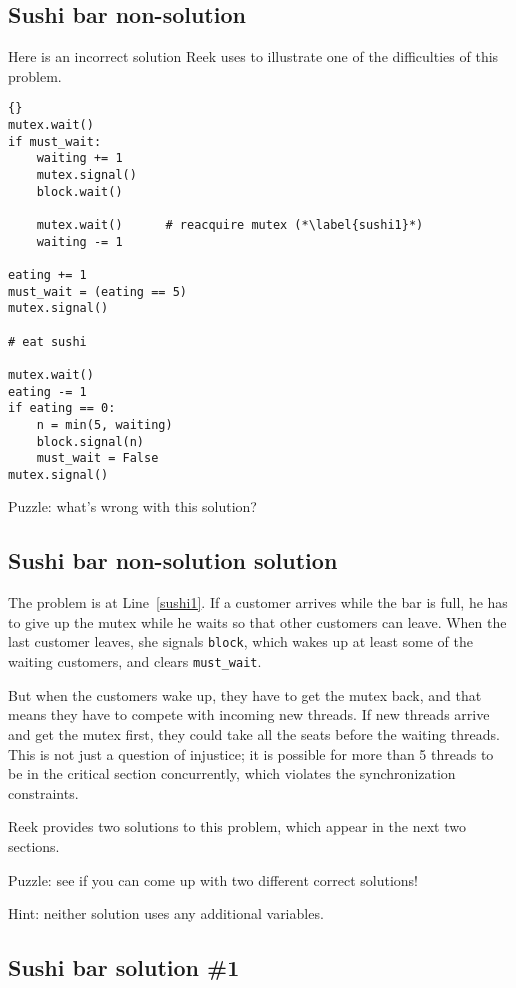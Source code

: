 \documentclass{book}
\newcommand{\clearemptydoublepage}{\newpage\cleardoublepage}
\begin{document}
\clearemptydoublepage
\subsection {Sushi bar non-solution}

Here is an incorrect solution Reek uses to illustrate one
of the difficulties of this problem.

\begin{lstlisting}[title={Sushi bar non-solution}]{}
mutex.wait()
if must_wait:
    waiting += 1
    mutex.signal()
    block.wait()

    mutex.wait()      # reacquire mutex (*\label{sushi1}*)
    waiting -= 1

eating += 1
must_wait = (eating == 5)
mutex.signal()

# eat sushi

mutex.wait()
eating -= 1
if eating == 0:
    n = min(5, waiting)
    block.signal(n)
    must_wait = False
mutex.signal()
\end{lstlisting}

Puzzle: what's wrong with this solution?


\clearemptydoublepage
\subsection {Sushi bar non-solution solution}

The problem is at Line~\ref{sushi1}.  If a customer arrives
while the bar is full, he has to give up the mutex while he
waits so that other customers can leave.  When the last customer
leaves, she signals {\tt block}, which wakes up at least some
of the waiting customers, and clears {\tt must\_wait}.

But when the customers wake up, they have to get the mutex
back, and that means they have to compete with incoming new
threads.  If new threads arrive and get the mutex first,
they could take all the seats before the waiting threads.
This is not just a question of injustice; it is possible for more
than 5 threads to be in the critical section concurrently, which
violates the synchronization constraints.

Reek provides two solutions to this problem, which appear
in the next two sections.

Puzzle: see if you can come up with two different correct solutions!

Hint: neither solution uses any additional variables.

\clearemptydoublepage
\subsection {Sushi bar solution \#1}
\end{document}
